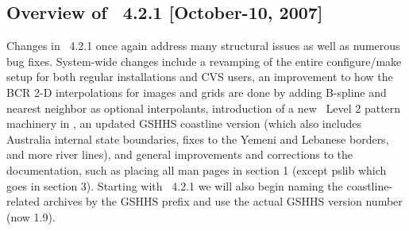 \begin{description}
\end{description}

\subsection{Overview of \gmt\ 4.2.1 [October-10, 2007]}

Changes in \GMT\ 4.2.1 once again address many structural issues as well as numerous bug fixes.
System-wide changes include a revamping of the entire configure/make setup for both regular
installations and CVS users, an improvement to how the BCR 2-D interpolations for images and grids
are done by adding B-spline and nearest neighbor as optional interpolants, introduction of
a new \PS\ Level 2 pattern machinery in , an updated GSHHS coastline version (which
also includes Australia internal state
boundaries, fixes to the Yemeni and Lebanese borders, and more river lines), and general
improvements and corrections to the documentation, such as placing all man pages in section 1
(except pslib which goes in section 3). Starting with \GMT\ 4.2.1 we will also begin naming
the coastline-related archives by the GSHHS prefix and use the actual GSHHS version number (now
1.9).

